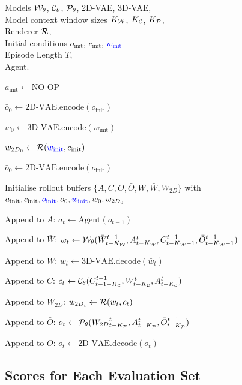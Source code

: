 \documentclass{article}
\theoremstyle{plain}
\theoremstyle{definition}
\theoremstyle{remark}
\newcommand{\ColorState}[2]{\State {\color{#1}#2}}
\newlength{\algleftcol}
\newcommand{\AlgLeftBox}[1]{%
  \parbox[t]{\algleftcol}{\raggedright\strut\ignorespaces#1\unskip\strut}%
}
\let\OldState\State
\renewcommand{\State}[1]{%
  \OldState \AlgLeftBox{#1}%
}
\newcommand{\Input}[1]{%
  \Require \parbox[t]{\algleftcol}{\raggedright #1}%
}
\renewcommand{\Input}[1]{%
  \Require \AlgLeftBox{#1}%
}
\begin{document}
\begin{algorithm}[htb!]
\centering
\caption{PERSIST$+w_0$ inference logic. \textcolor{blue}{Changes to  in blue.}}\label{alg:PERSIST-w0}
\begin{algorithmic}[1]
\Input{Models ${\mathcal{W}}_\theta$, ${\mathcal{C}}_\theta$, ${\mathcal{P}}_\theta$, 2D-VAE, 3D-VAE, \\ Model context window sizes $K_{{\mathcal{W}}}$, $K_{{\mathcal{C}}}$, $K_{{\mathcal{P}}}$, \\ 
Renderer ${\mathcal{R}}$, \\
Initial conditions $o_\text{init}$, $c_\text{init}$, \textcolor{blue}{$w_\text{init}$} \\
Episode Length $T$, \\
Agent.}
\State{$a_\text{init}\leftarrow \text{NO-OP}$} 
\State{$\bar{o}_0 \leftarrow \text{2D-VAE.encode}(o_\text{init})$}
\ColorState{blue}{$\bar{w}_0 \leftarrow \text{3D-VAE.encode}(w_\text{init})$}
\State{$w_{{2D}_0} \leftarrow {\mathcal{R}}(\textcolor{blue}{w_\text{init}},c_\text{init})$}
\ColorState{blue}{$\bar{o}_0 \leftarrow \text{2D-VAE.encode}(o_\text{init})$}
\State{Initialise rollout buffers $\{A,C,O,\bar{O},W,\bar{W},W_{2D}\}$ with $a_\text{init},c_\text{init},\textcolor{blue}{o_\text{init}},\bar{o}_0,\textcolor{blue}{w_\text{init}},\bar{w}_0,w_{{2D}_0}$} 
\State{Append to $A$: $a_t \leftarrow \text{Agent}(o_{t-1})$}
\State{Append to $\bar{W}$: $\bar{w}_t \leftarrow {\mathcal{W}}_\theta(\bar{W}^{t-1}_{t-K_{\mathcal{W}}}, A^t_{t-K_{\mathcal{W}}}, C^{t-1}_{t-K_{\mathcal{W}}-1}, \bar{O}^{t-1}_{t-K_{\mathcal{W}}-1})$}
\State{Append to $W$: $w_t \leftarrow \text{3D-VAE.decode}(\bar{w}_t)$}
\State{Append to $C$: $c_t \leftarrow {\mathcal{C}}_\theta (C^{t-1}_{t-1-K_{\mathcal{C}}}, W^t_{t-K_{\mathcal{C}}}, A^t_{t-K_{\mathcal{C}}})$}
\State{Append to $W_{2D}$: $w_{{2D}_t} \leftarrow {\mathcal{R}}(w_t,c_t)$}
\State{Append to $\bar{O}$: $\bar{o}_t \leftarrow {\mathcal{P}}_\theta ({W_{2D}}_{t-K_{\mathcal{P}}}^{t}, A^t_{t-K_{\mathcal{P}}}, \bar{O}^{t-1}_{t-K_{\mathcal{P}}})$}
\State{Append to $O$: $o_t \leftarrow \text{2D-VAE.decode}(\bar{o}_t)$}
\EndFor
\end{algorithmic}
\end{algorithm}


\clearpage

\subsection{Scores for Each Evaluation Set}
\end{document}
